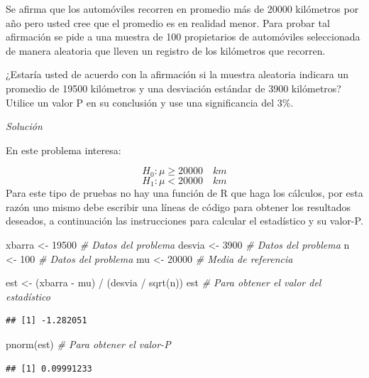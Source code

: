 \documentclass[
]{book}
\makeatletter
\newenvironment{Shaded}{\begin{snugshade}}{\end{snugshade}}
\newcommand{\CommentTok}[1]{\textcolor[rgb]{0.56,0.35,0.01}{\textit{#1}}}
\newcommand{\DecValTok}[1]{\textcolor[rgb]{0.00,0.00,0.81}{#1}}
\newcommand{\FunctionTok}[1]{\textcolor[rgb]{0.00,0.00,0.00}{#1}}
\newcommand{\NormalTok}[1]{#1}
\newcommand{\OtherTok}[1]{\textcolor[rgb]{0.56,0.35,0.01}{#1}}
\newcommand{\SpecialCharTok}[1]{\textcolor[rgb]{0.00,0.00,0.00}{#1}}
\newenvironment{kframe}{%
\medskip{}
\setlength{\fboxsep}{.8em}
 \def\at@end@of@kframe{}%
 \ifinner\ifhmode%
  \def\at@end@of@kframe{\end{minipage}}%
  \begin{minipage}{\columnwidth}%
 \fi\fi%
 \def\FrameCommand##1{\hskip\@totalleftmargin \hskip-\fboxsep
 \colorbox{shadecolor}{##1}\hskip-\fboxsep
     \hskip-\linewidth \hskip-\@totalleftmargin \hskip\columnwidth}%
 \MakeFramed {\advance\hsize-\width
   \@totalleftmargin\z@ \linewidth\hsize
   \@setminipage}}%
 {\par\unskip\endMakeFramed%
 \at@end@of@kframe}
\renewenvironment{Shaded}{\begin{kframe}}{\end{kframe}}
\makeatother
\begin{document}
Se afirma que los automóviles recorren en promedio más de 20000 kilómetros por año pero usted cree que el promedio es en realidad menor. Para probar tal afirmación se pide a una muestra de 100 propietarios de automóviles seleccionada de manera aleatoria que lleven un registro de los kilómetros que recorren.

¿Estaría usted de acuerdo con la afirmación si la muestra aleatoria indicara un promedio de 19500 kilómetros y una desviación estándar de 3900 kilómetros? Utilice un valor P en su conclusión y use una significancia del 3\%.

\emph{Solución}

En este problema interesa:

\[H_0: \mu \ge 20000 \quad km\]
\[H_1: \mu < 20000 \quad km\]
Para este tipo de pruebas no hay una función de R que haga los cálculos, por esta razón uno mismo debe escribir una líneas de código para obtener los resultados deseados, a continuación las instrucciones para calcular el estadístico y su valor-P.

\begin{Shaded}
\begin{Highlighting}[]
\NormalTok{xbarra }\OtherTok{\textless{}{-}} \DecValTok{19500}  \CommentTok{\# Datos del problema}
\NormalTok{desvia }\OtherTok{\textless{}{-}} \DecValTok{3900}   \CommentTok{\# Datos del problema}
\NormalTok{n }\OtherTok{\textless{}{-}} \DecValTok{100}         \CommentTok{\# Datos del problema}
\NormalTok{mu }\OtherTok{\textless{}{-}} \DecValTok{20000}      \CommentTok{\# Media de referencia}

\NormalTok{est }\OtherTok{\textless{}{-}}\NormalTok{ (xbarra }\SpecialCharTok{{-}}\NormalTok{ mu) }\SpecialCharTok{/}\NormalTok{ (desvia }\SpecialCharTok{/} \FunctionTok{sqrt}\NormalTok{(n))}
\NormalTok{est  }\CommentTok{\# Para obtener el valor del estadístico}
\end{Highlighting}
\end{Shaded}

\begin{verbatim}
## [1] -1.282051
\end{verbatim}

\begin{Shaded}
\begin{Highlighting}[]
\FunctionTok{pnorm}\NormalTok{(est)  }\CommentTok{\# Para obtener el valor{-}P}
\end{Highlighting}
\end{Shaded}

\begin{verbatim}
## [1] 0.09991233
\end{verbatim}
\end{document}
